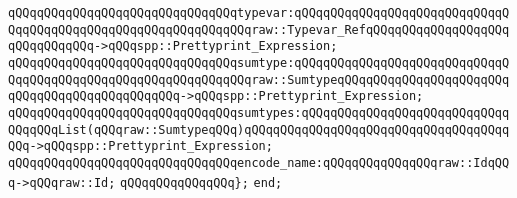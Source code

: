 \verb|qQQqqQQqqQQqqQQqqQQqqQQqqQQqqQQqtypevar:qQQqqQQqqQQqqQQqqQQqqQQqqQQqqQQqqQQqqQQqqQQqqQQqqQQqqQQqqQQqqQQqraw::Typevar_RefqQQqqQQqqQQqqQQqqQQqqQQqqQQqqQQq->qQQqspp::Prettyprint_Expression;|\newline
\verb|qQQqqQQqqQQqqQQqqQQqqQQqqQQqqQQqsumtype:qQQqqQQqqQQqqQQqqQQqqQQqqQQqqQQqqQQqqQQqqQQqqQQqqQQqqQQqqQQqqQQqraw::SumtypeqQQqqQQqqQQqqQQqqQQqqQQqqQQqqQQqqQQqqQQqqQQqqQQq->qQQqspp::Prettyprint_Expression;|\newline
\verb|qQQqqQQqqQQqqQQqqQQqqQQqqQQqqQQqsumtypes:qQQqqQQqqQQqqQQqqQQqqQQqqQQqqQQqqQQqList(qQQqraw::SumtypeqQQq)qQQqqQQqqQQqqQQqqQQqqQQqqQQqqQQqqQQqqQQq->qQQqspp::Prettyprint_Expression;|\newline
\newline
\verb|qQQqqQQqqQQqqQQqqQQqqQQqqQQqqQQqencode_name:qQQqqQQqqQQqqQQqraw::IdqQQq->qQQqraw::Id;|\newline
\verb|qQQqqQQqqQQqqQQq};|\newline
\verb|end;|\newline

